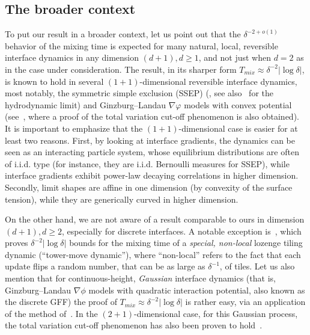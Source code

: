 \documentclass[10pt]{amsart}
\theoremstyle{definition}\newtheorem{defi}[theo]{Definition}\newtheorem{rema}[theo]{Remark}\newtheorem{exam}[theo]{Example}\newtheorem{exem}[theo]{Example}\newtheorem{nota}[theo]{Notation}
\begin{document}
\subsection{The broader context}

To put our result in a broader context, let us point out that the $\delta^{-2+o(1)}$ behavior of the mixing time is expected for many natural, local, reversible interface dynamics in any dimension $(d+1),d\ge1$, and not just when $d=2$ as in the case under consideration. The result, in its sharper form $T_{mix}\approx \delta^{-2}|\log \delta|$, is known to hold in several $(1+1)$-dimensional reversible interface dynamics, most notably, the symmetric simple exclusion (SSEP) (\cite{Lacoin,Wilson}, see also~\cite{KL} for the hydrodynamic limit) and Ginzburg--Landau $\nabla\varphi$ models with convex potential (see~\cite{CLL}, where a proof of the total variation cut-off phenomenon is also obtained). It is important to emphasize that the $(1+1)$-dimensional case is easier for at least two reasons. First, by looking at interface gradients, the dynamics can be seen as an interacting particle system, whose equilibrium distributions are often of i.i.d. type (for instance, they are i.i.d. Bernoulli measures for SSEP), while interface gradients exhibit power-law decaying correlations in higher dimension. Secondly, limit shapes are affine in one dimension (by convexity of the surface tension), while they are generically curved in higher dimension.


On the other hand, we are not aware of a result comparable to ours in dimension $(d+1),d\ge2$, especially for discrete interfaces. A notable exception is~\cite{Wilson}, which proves $\delta^{-2}|\log \delta|$ bounds for the mixing time of a \emph{special, non-local} lozenge tiling dynamic (``tower-move dynamic''), where ``non-local'' refers to the fact that each update flips a random number, that can be as large as $\delta^{-1}$, of tiles. Let us also mention that for continuous-height, \emph{Gaussian} interface dynamics (that is, Ginzburg--Landau $\nabla \phi$ models with quadratic interaction potential, also known as the discrete GFF) the proof of $T_{mix}\approx \delta^{-2}|\log \delta|$ is rather easy, via an application of the method of~\cite{Wilson}. In the $(2+1)$-dimensional case, for this Gaussian process, the total variation cut-off phenomenon has also been proven to hold~\cite{GG}.
\end{document}
